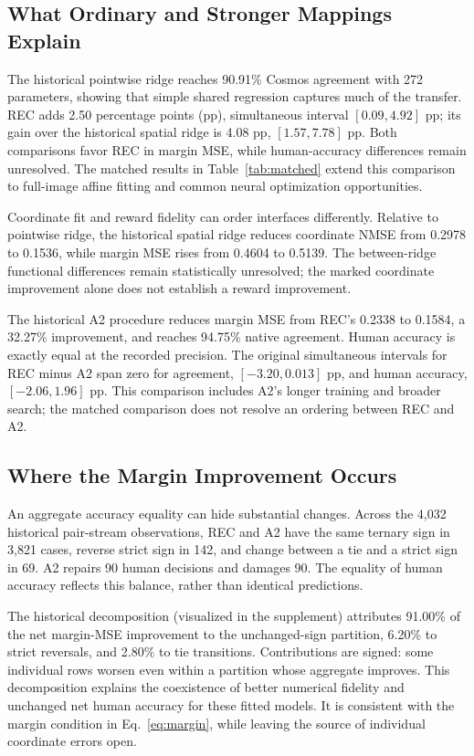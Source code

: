 \documentclass[10pt,twocolumn,letterpaper]{article}
\begin{document}
\subsection{What Ordinary and Stronger Mappings Explain}
The historical pointwise ridge reaches 90.91\% Cosmos agreement with 272 parameters, showing that simple shared regression captures much of the transfer. REC adds 2.50 percentage points (pp), simultaneous interval $[0.09,4.92]$ pp; its gain over the historical spatial ridge is 4.08 pp, $[1.57,7.78]$ pp. Both comparisons favor REC in margin MSE, while human-accuracy differences remain unresolved. The matched results in Table~\ref{tab:matched} extend this comparison to full-image affine fitting and common neural optimization opportunities.

Coordinate fit and reward fidelity can order interfaces differently. Relative to pointwise ridge, the historical spatial ridge reduces coordinate NMSE from 0.2978 to 0.1536, while margin MSE rises from 0.4604 to 0.5139. The between-ridge functional differences remain statistically unresolved; the marked coordinate improvement alone does not establish a reward improvement.

The historical A2 procedure reduces margin MSE from REC's 0.2338 to 0.1584, a 32.27\% improvement, and reaches 94.75\% native agreement. Human accuracy is exactly equal at the recorded precision. The original simultaneous intervals for REC minus A2 span zero for agreement, $[-3.20,0.013]$ pp, and human accuracy, $[-2.06,1.96]$ pp. This comparison includes A2's longer training and broader search; the matched comparison does not resolve an ordering between REC and A2.

\subsection{Where the Margin Improvement Occurs}


An aggregate accuracy equality can hide substantial changes. Across the 4,032 historical pair-stream observations, REC and A2 have the same ternary sign in 3,821 cases, reverse strict sign in 142, and change between a tie and a strict sign in 69. A2 repairs 90 human decisions and damages 90. The equality of human accuracy reflects this balance, rather than identical predictions.

The historical decomposition (visualized in the supplement) attributes 91.00\% of the net margin-MSE improvement to the unchanged-sign partition, 6.20\% to strict reversals, and 2.80\% to tie transitions. Contributions are signed: some individual rows worsen even within a partition whose aggregate improves. This decomposition explains the coexistence of better numerical fidelity and unchanged net human accuracy for these fitted models. It is consistent with the margin condition in Eq.~\eqref{eq:margin}, while leaving the source of individual coordinate errors open.
\end{document}

